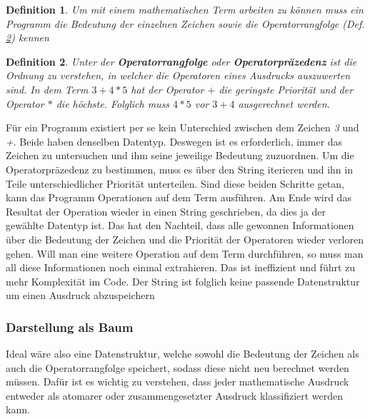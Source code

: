 \documentclass[11pt]{article}
\newtheorem{defin}{Definition}
\newcommand{\lab}[1]{(Def. \ref{#1})}
\begin{document}
\begin{defin}
  Um mit einem mathematischen Term arbeiten zu können muss ein Programm die Bedeutung
  der einzelnen Zeichen sowie die Operatorrangfolge \lab{def:operatorrangfolge} kennen
\label{def:programm_infos}
\end{defin}

\begin{defin}
Unter der \textbf{Operatorrangfolge} oder \textbf{Operatorpräzedenz} ist die Ordnung zu verstehen, 
in welcher die Operatoren eines Ausdrucks auszuwerten sind.
In dem Term $3+4*5$ hat der Operator $+$ die geringste Priorität und der Operator $*$ die höchste. 
Folglich muss $4*5$ vor $3+4$ ausgerechnet werden. 
\label{def:operatorrangfolge}
\end{defin}

Für ein Programm existiert per se kein Unterschied zwischen dem Zeichen \textit{3} und \textit{+}. 
Beide haben denselben Datentyp. Deswegen ist es erforderlich, immer das Zeichen zu untersuchen und 
ihm seine jeweilige Bedeutung zuzuordnen. \newline
Um die Operatorpräzedenz zu bestimmen, muss es über den String iterieren und ihn in Teile unterschiedlicher Priorität unterteilen.
Sind diese beiden Schritte getan, kann das Programm Operationen auf dem Term ausführen. \newline
Am Ende wird das Resultat der Operation wieder in einen String geschrieben, da dies ja der gewählte Datentyp ist. 
Das hat den Nachteil, dass alle gewonnen Informationen über die Bedeutung der Zeichen und die Priorität der Operatoren 
wieder verloren gehen. Will man eine weitere Operation auf dem Term durchführen, 
so muss man all diese Informationen noch einmal extrahieren. 
Das ist ineffizient und führt zu mehr Komplexität im Code. \newline
Der String ist folglich keine passende Datenstruktur um einen Ausdruck abzuspeichern

\subsubsection{Darstellung als Baum}

Ideal wäre also eine Datenstruktur, welche sowohl die Bedeutung der Zeichen als auch die Operatorrangfolge speichert,
sodass diese nicht neu berechnet werden müssen. \newline
Dafür ist es wichtig zu verstehen, dass jeder mathematische Ausdruck entweder als atomarer 
oder zusammengesetzter Ausdruck klassifiziert werden kann.
\end{document}
